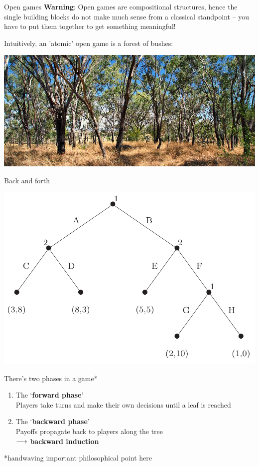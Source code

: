 \begin{framecard}
	{\color{white}
	\bfseries

	}
\end{framecard}


\begin{frame}{Open games}
	\textbf{Warning}: Open games are compositional structures, hence the single building blocks do not make much sense from a classical standpoint -- you have to put them together to get something meaningful!

	\vfill
	Intuitively, an 'atomic' open game is a forest of bushes:

	\begin{center}
		\includegraphics[width=.9\textwidth]{figures/bush_forest.jpg}
	\end{center}
\end{frame}

\begin{frame}{Back and forth}
	\vspace{-5ex}
	\begin{center}
		\hspace{10ex}
		\includegraphics[width=.5\textwidth]{figures/ext_game.png}
	\end{center}

	\vspace{-6ex}
	There's two phases in a game*
	\begin{enumerate}
		\item The `\textbf{forward phase}'\\
		Players take turns and make their own decisions until a leaf is reached
		\item The `\textbf{backward phase}'\\
		Payoffs propagate back to players along the tree\\
		\qquad $\longrightarrow$ \textbf{backward induction}
	\end{enumerate}

	\vfill
	{\color{colornote}*handwaving important philosophical point here}
\end{frame}

